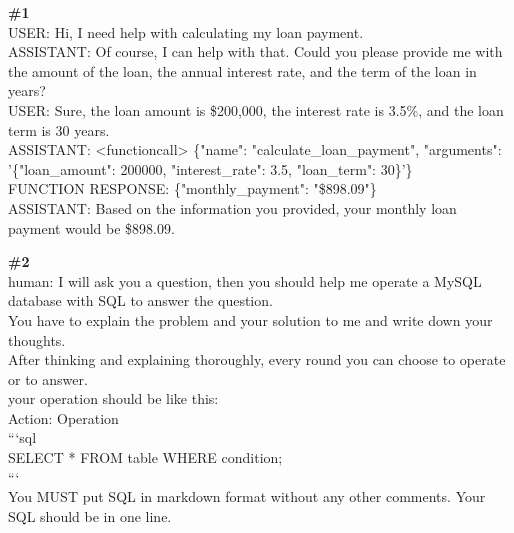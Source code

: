 \documentclass[10pt]{article}
\begin{document}
\begin{Form}
\begin{tcolorbox}[colback=convbg,colframe=itemframe,boxrule=0.8pt,arc=2pt,breakable,left=6pt,right=6pt,top=5pt,bottom=5pt]
{\footnotesize\textbf{\#1}}\\[3pt]
{\footnotesize USER: Hi, I need help with calculating my loan payment. \\[2pt]
ASSISTANT: Of course, I can help with that. Could you please provide me with the amount of the loan, the annual interest rate, and the term of the loan in years?   \\[2pt]
USER: Sure, the loan amount is \$200,000, the interest rate is 3.5\%, and the loan term is 30 years. \\[2pt]
ASSISTANT: <functioncall> \{"name": "calculate\_loan\_payment", "arguments": '\{"loan\_amount": 200000, "interest\_rate": 3.5, "loan\_term": 30\}'\}   \\[2pt]
FUNCTION RESPONSE: \{"monthly\_payment": "\$898.09"\} \\[2pt]
ASSISTANT: Based on the information you provided, your monthly loan payment would be \$898.09.  }
\end{tcolorbox}
\vspace{-1pt}
\CheckBox[name=q1c,width=1.6ex,height=1.6ex,bordercolor={0.45 0.45 0.45}]{~\textcolor{cbox}{COMPACT}}\quad
\CheckBox[name=q1d,width=1.6ex,height=1.6ex,bordercolor={0.45 0.45 0.45}]{~\textcolor{dbox}{DIFFUSE}}\quad
\CheckBox[name=q1n,width=1.6ex,height=1.6ex,bordercolor={0.45 0.45 0.45}]{~\textcolor{nbox}{NONE}}
\vspace{8pt}
\begin{tcolorbox}[colback=convbg,colframe=itemframe,boxrule=0.8pt,arc=2pt,breakable,left=6pt,right=6pt,top=5pt,bottom=5pt]
{\footnotesize\textbf{\#2}}\\[3pt]
{\footnotesize human: I will ask you a question, then you should help me operate a MySQL database with SQL to answer the question. \\[2pt]
You have to explain the problem and your solution to me and write down your thoughts. \\[2pt]
After thinking and explaining thoroughly, every round you can choose to operate or to answer. \\[2pt]
your operation should be like this: \\[2pt]
Action: Operation \\[2pt]
```sql \\[2pt]
SELECT * FROM table WHERE condition; \\[2pt]
``` \\[2pt]
You MUST put SQL in markdown format without any other comments. Your SQL should be in one line. \\[2pt]
}
\end{tcolorbox}
\end{Form}
\end{document}

